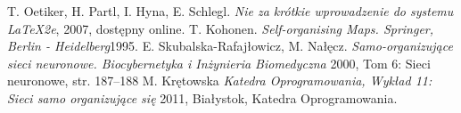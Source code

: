 \documentclass[12pt]{article}
\begin{document}

\renewcommand\refname{Bibliografia}

\begin{thebibliography}{0}
 T. Oetiker, H. Partl, I. Hyna, E. Schlegl.
\textsl{Nie za krótkie wprowadzenie do systemu \LaTeX2e}, 2007, dostępny online.
 T. Kohonen.
\textsl{Self-organising Maps. Springer, Berlin - Heidelberg}1995.
 E. Skubalska-Rafajłowicz, M. Nałęcz.
\textsl{Samo-organizujące sieci neuronowe. Biocybernetyka i Inżynieria Biomedyczna }2000, Tom 6: Sieci neuronowe, str. 187–188
M. Krętowska
\textsl{Katedra Oprogramowania, Wykład 11: Sieci samo organizujące się} 2011, Białystok, Katedra Oprogramowania.
\end{thebibliography}
\end{document}
